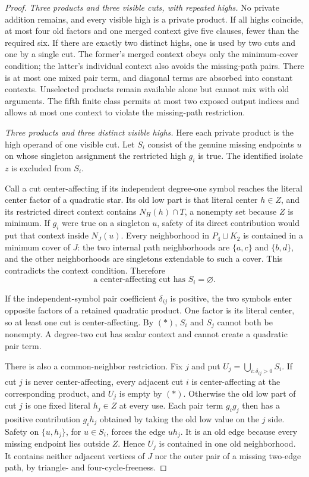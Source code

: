 \begin{proof}
\emph{Three products and three visible cuts, with repeated highs.}
No private addition remains, and every visible high is a private
product. If all highs coincide, at most four old factors and one
merged context give five clauses, fewer than the required six. If
there are exactly two distinct highs, one is used by two cuts and one
by a single cut. The former's merged context obeys only the
minimum-cover condition; the latter's individual context also avoids
the missing-path pairs. There is at most one mixed pair term, and
diagonal terms are absorbed into constant contexts. Unselected
products remain available alone but cannot mix with old arguments.
The fifth finite class permits at most two exposed output indices and
allows at most one context to violate the missing-path restriction.

\emph{Three products and three distinct visible highs.}
Here each private product is the high operand of one visible cut.
Let $S_i$ consist of the genuine missing endpoints $u$ on whose
singleton assignment the restricted high $g_i$ is true. The identified
isolate $z$ is excluded from $S_i$.

Call a cut center-affecting if its independent degree-one symbol
reaches the literal center factor of a quadratic star. Its old low
part is that literal center $h\in Z$, and its restricted direct
context contains $N_H(h)\cap T$, a nonempty set because $Z$ is minimum.
If $g_i$ were true on a singleton $u$, safety of its direct contribution
would put that context inside $N_J(u)$. Every neighborhood in
$P_4\sqcup K_2$ is contained in a minimum cover of $J$: the two internal
path neighborhoods are $\{a,c\}$ and $\{b,d\}$, and the other
neighborhoods are singletons extendable to such a cover. This
contradicts the context condition. Therefore
\[
 \text{a center-affecting cut has }S_i=\varnothing.             \tag{*}
\]

If the independent-symbol pair coefficient $\delta_{ij}$ is positive,
the two symbols enter opposite factors of a retained quadratic
product. One factor is its literal center, so at least one cut is
center-affecting. By $(\ast)$, $S_i$ and $S_j$ cannot both be nonempty.
A degree-two cut has scalar context and cannot create a quadratic
pair term.

There is also a common-neighbor restriction. Fix $j$ and put
$U_j=\bigcup_{i:\delta_{ij}>0}S_i$. If cut $j$ is never
center-affecting, every adjacent cut $i$ is center-affecting at the
corresponding product, and $U_j$ is empty by $(\ast)$. Otherwise the
old low part of cut $j$ is one fixed literal $h_j\in Z$ at every use.
Each pair term $g_i g_j$ then has a positive contribution $g_i h_j$
obtained by taking the old low value on the $j$ side. Safety on
$\{u,h_j\}$, for $u\in S_i$, forces the edge $uh_j$. It is an old edge
because every missing endpoint lies outside $Z$. Hence $U_j$ is
contained in one old neighborhood. It contains neither adjacent
vertices of $J$ nor the outer pair of a missing two-edge path, by
triangle- and four-cycle-freeness.


\end{proof}
